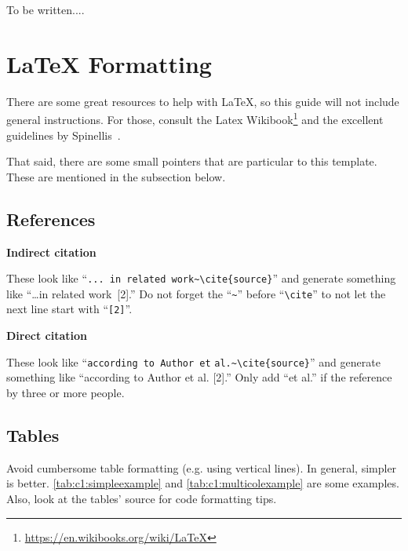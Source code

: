 {\color{red} To be written...}.


\section{\LaTeX{} Formatting}
\label{sec:c1:latex}

There are some great resources to help with \LaTeX,
so this guide will not include general instructions.
For those, consult the Latex Wikibook\footnote{\url{https://en.wikibooks.org/wiki/LaTeX}}
and the excellent guidelines by Spinellis~\cite{spinellis:latexadvice}.

That said, there are some small pointers that are particular to this template.
These are mentioned in the subsection below.

\subsection{References}
\label{sec:c1:References}

\noindent
\textbf{Indirect citation}

These look like ``\verb|... in related work~\cite{source}|'' and generate something like ``\dots in related work~[2].''
Do not forget the ``\verb|~|'' before ``\verb|\cite|'' to not let the next line start with ``\verb|[2]|''.

\vspace{0.5cm}
\noindent
\textbf{Direct citation}

These look like ``\texttt{according to Author et} \verb|al.~\cite{source}|'' and generate something like ``according to Author et al. [2].''
Only add ``et al.'' if the reference by three or more people.

\subsection{Tables}
\label{sec:c1:latex_tables}

Avoid cumbersome table formatting (e.g. using vertical lines).
In general, simpler is better.
\autoref{tab:c1:simpleexample} and \autoref{tab:c1:multicolexample} are some examples.
Also, look at the tables' source for code formatting tips.

